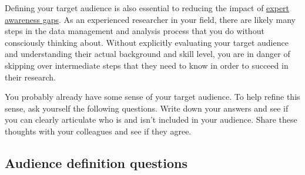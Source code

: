 \documentclass[
]{book}
\begin{document}
Defining your target audience is also essential to reducing the impact of
\href{https://carpentries.github.io/instructor-training/03-expertise/index.html\#expertise-and-teaching}{expert awareness gaps}.
As an experienced researcher in your field, there are likely many steps in the data
management and analysis process that you do without consciously thinking about. Without
explicitly evaluating your target audience and understanding their actual background
and skill level, you are in danger of skipping over intermediate steps that they
need to know in order to succeed in their research.

You probably already have some sense of your target audience. To help refine this sense, ask yourself the
following questions. Write down your answers and see if you can clearly articulate who is and isn't included
in your audience. Share these thoughts with your colleagues and see if they agree.

\hypertarget{audience-definition-questions}{%
\subsection{Audience definition questions}\label{audience-definition-questions}}
\end{document}
